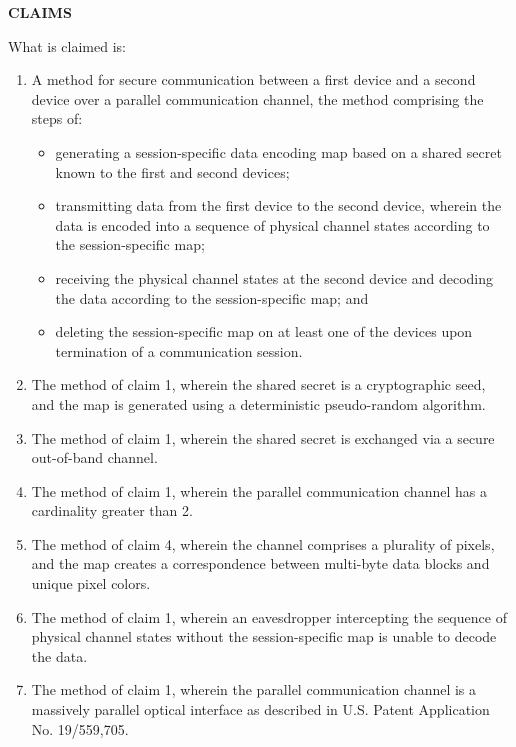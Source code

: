 \documentclass[11pt,letterpaper]{article}
\begin{document}
\thispagestyle{empty}

\begin{center}
    \textbf{\large CLAIMS}
\end{center}

\vspace{0.4cm}
\noindent What is claimed is:

\begin{enumerate}[label=\textbf{\arabic*.}, leftmargin=0.5in, itemsep=0.4cm]
    \item A method for secure communication between a first device and a second device over a parallel communication channel, the method comprising the steps of:
    \begin{itemize}[leftmargin=0.3in, noitemsep]
        \item generating a session-specific data encoding map based on a shared secret known to the first and second devices;
        \item transmitting data from the first device to the second device, wherein the data is encoded into a sequence of physical channel states according to the session-specific map;
        \item receiving the physical channel states at the second device and decoding the data according to the session-specific map; and
        \item deleting the session-specific map on at least one of the devices upon termination of a communication session.
    \end{itemize}

    \item The method of claim 1, wherein the shared secret is a cryptographic seed, and the map is generated using a deterministic pseudo-random algorithm.

    \item The method of claim 1, wherein the shared secret is exchanged via a secure out-of-band channel.

    \item The method of claim 1, wherein the parallel communication channel has a cardinality greater than 2.

    \item The method of claim 4, wherein the channel comprises a plurality of pixels, and the map creates a correspondence between multi-byte data blocks and unique pixel colors.

    \item The method of claim 1, wherein an eavesdropper intercepting the sequence of physical channel states without the session-specific map is unable to decode the data.

    \item The method of claim 1, wherein the parallel communication channel is a massively parallel optical interface as described in U.S. Patent Application No. 19/559,705.
\end{enumerate}
\end{document}
